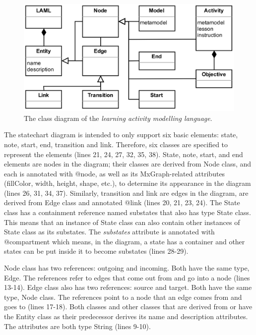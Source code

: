 \documentclass[conference]{IEEEtran}
\begin{document}
\begin{figure}[t!]
\centering
\includegraphics[width=\linewidth]{laml}
\caption{The class diagram of the \emph{learning activity modelling language}.}
\label{laml}
\end{figure}

The statechart diagram is intended to only support six basic elements: state, note, start, end, transition and link. Therefore, six classes are specified to represent the elements (lines 21, 24, 27, 32, 35, 38). State, note, start, and end elements are nodes in the diagram; their classes are derived from Node class, and each is annotated with {\selectfont @node}, as well as its MxGraph-related attributes (fillColor, width, height, shape, etc.), to determine its appearance in the diagram (lines 26, 31, 34, 37). Similarly, transition and link are edges in the diagram, are derived from Edge class and annotated {\selectfont @link} (lines 20, 21, 23, 24). The State class has a containment reference named substates that also has type State class. This means that an instance of State class can also contain other instances of State class as its substates. The \emph{substates} attribute is annotated with {\selectfont @compartment} which means, in the diagram, a state has a container and other states can be put inside it to become substates (lines 28-29).

Node class has two references: outgoing and incoming. Both have the same type, Edge. The references refer to edges that come out from and go into a node (lines 13-14). Edge class also has two references: source and target. Both have the same type, Node class. The references point to a node that an edge comes from and goes to (lines 17-18). Both classes and other classes that are derived from or have the Entity class as their predecessor derives its name and description attributes.  The attributes are both type String (lines 9-10).
\end{document}
